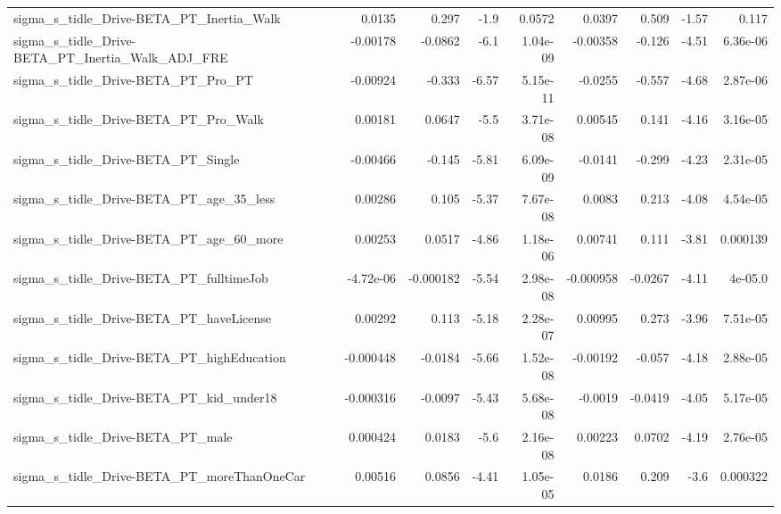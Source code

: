 \begin{tabular}{lrrrrrrrr}
sigma\_s\_tidle\_Drive-BETA\_PT\_Inertia\_Walk           &      0.0135 &        0.297 &     -1.9 &   0.0572 &     0.0397 &       0.509 &        -1.57 &         0.117 \\
sigma\_s\_tidle\_Drive-BETA\_PT\_Inertia\_Walk\_ADJ\_FRE   &    -0.00178 &      -0.0862 &     -6.1 & 1.04e-09 &   -0.00358 &      -0.126 &        -4.51 &      6.36e-06 \\
sigma\_s\_tidle\_Drive-BETA\_PT\_Pro\_PT                 &    -0.00924 &       -0.333 &    -6.57 & 5.15e-11 &    -0.0255 &      -0.557 &        -4.68 &      2.87e-06 \\
sigma\_s\_tidle\_Drive-BETA\_PT\_Pro\_Walk               &     0.00181 &       0.0647 &     -5.5 & 3.71e-08 &    0.00545 &       0.141 &        -4.16 &      3.16e-05 \\
sigma\_s\_tidle\_Drive-BETA\_PT\_Single                 &    -0.00466 &       -0.145 &    -5.81 & 6.09e-09 &    -0.0141 &      -0.299 &        -4.23 &      2.31e-05 \\
sigma\_s\_tidle\_Drive-BETA\_PT\_age\_35\_less            &     0.00286 &        0.105 &    -5.37 & 7.67e-08 &     0.0083 &       0.213 &        -4.08 &      4.54e-05 \\
sigma\_s\_tidle\_Drive-BETA\_PT\_age\_60\_more            &     0.00253 &       0.0517 &    -4.86 & 1.18e-06 &    0.00741 &       0.111 &        -3.81 &      0.000139 \\
sigma\_s\_tidle\_Drive-BETA\_PT\_fulltimeJob            &   -4.72e-06 &    -0.000182 &    -5.54 & 2.98e-08 &  -0.000958 &     -0.0267 &        -4.11 &       4e-05.0 \\
sigma\_s\_tidle\_Drive-BETA\_PT\_haveLicense            &     0.00292 &        0.113 &    -5.18 & 2.28e-07 &    0.00995 &       0.273 &        -3.96 &      7.51e-05 \\
sigma\_s\_tidle\_Drive-BETA\_PT\_highEducation          &   -0.000448 &      -0.0184 &    -5.66 & 1.52e-08 &   -0.00192 &      -0.057 &        -4.18 &      2.88e-05 \\
sigma\_s\_tidle\_Drive-BETA\_PT\_kid\_under18            &   -0.000316 &      -0.0097 &    -5.43 & 5.68e-08 &    -0.0019 &     -0.0419 &        -4.05 &      5.17e-05 \\
sigma\_s\_tidle\_Drive-BETA\_PT\_male                   &    0.000424 &       0.0183 &     -5.6 & 2.16e-08 &    0.00223 &      0.0702 &        -4.19 &      2.76e-05 \\
sigma\_s\_tidle\_Drive-BETA\_PT\_moreThanOneCar         &     0.00516 &       0.0856 &    -4.41 & 1.05e-05 &     0.0186 &       0.209 &         -3.6 &      0.000322 \\

\end{tabular}
